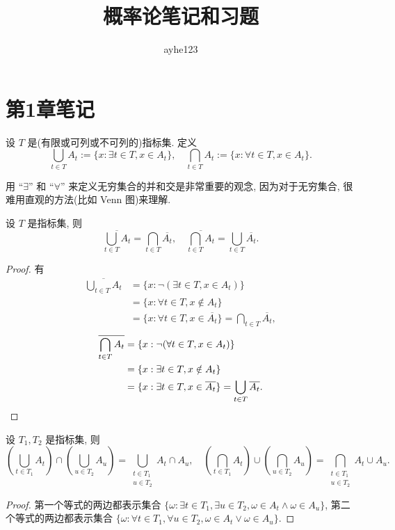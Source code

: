 \documentclass[color=black,device=normal,lang=cn]{elegantnote}
\date{\zhtoday}
\title{概率论笔记和习题}
\author{ayhe123}
\numberwithin{equation}{section}
\theoremstyle{plain}
\numberwithin{exercise}{exsection}
\begin{document}
\maketitle
\section{第1章笔记}
设 $T$ 是(有限或可列或不可列的)指标集. 定义
\begin{equation}\label{eq1.1}
    \bigcup\limits_{t\in T}A_t:=\{x:\exists t\in T,x\in A_t\},\quad\bigcap\limits_{t\in T}A_t:=\{x:\forall t\in T,x\in A_t\}.
\end{equation}

用 ``$\exists$'' 和 ``$\forall$'' 来定义无穷集合的并和交是非常重要的观念, 因为对于无穷集合, 很难用直观的方法(比如 Venn 图)来理解.
\begin{theorem}[De-Morgan]\label{t1.1}
    设 $T$ 是指标集, 则
    \[\overline{\bigcup\limits_{t\in T}A_t}=\bigcap\limits_{t\in T}\overline{A_t},\quad\overline{\bigcap\limits_{t\in T}A_t}=\bigcup\limits_{t\in T}\overline{A_t}.\]
\end{theorem}
\begin{proof}
    有
    \begin{align*}
        \overline{\bigcup\limits_{t\in T}A_t} & =\{x:\neg(\exists t\in T,x\in A_t)\} \\
        & =\{x:\forall t\in T,x\notin A_t\} \\
        & =\{x:\forall t\in T,x\in \overline{A_t}\}=\bigcap\limits_{t\in T}\overline{A_t},
    \end{align*}
    \begin{align*}
        \overline{\bigcap\limits_{t\in T}A_t} & =\{x:\neg(\forall t\in T,x\in A_t)\} \\
        & =\{x:\exists t\in T,x\notin A_t\} \\
        & =\{x:\exists t\in T,x\in\overline{A_t}\}=\bigcup\limits_{t\in T}\overline{A_t}.\qedhere
    \end{align*}
\end{proof}
\begin{theorem}\label{t1.2}
    设 $T_1,T_2$ 是指标集, 则
    \[\left(\bigcup\limits_{t\in T_1}A_t\right)\cap\left(\bigcup\limits_{u\in T_2}A_u\right)=\bigcup\limits_{\substack{t\in T_1\\u\in T_2}}A_t\cap A_u,\quad\left(\bigcap\limits_{t\in T_1}A_t\right)\cup\left(\bigcap\limits_{u\in T_2}A_u\right)=\bigcap\limits_{\substack{t\in T_1\\u\in T_2}}A_t\cup A_u.\]
\end{theorem}
\begin{proof}
    第一个等式的两边都表示集合 $\{\omega:\exists t\in T_1,\exists u\in T_2,\omega\in A_t\wedge\omega\in A_u\}$, 第二个等式的两边都表示集合 $\{\omega:\forall t\in T_1,\forall u\in T_2,\omega\in A_t\vee\omega\in A_u\}$.
\end{proof}
\end{document}
